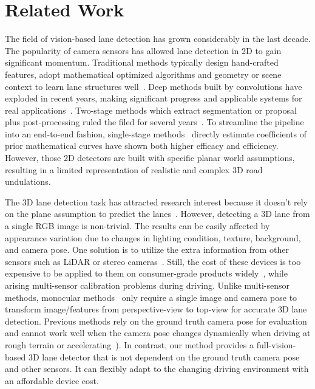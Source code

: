 \documentclass[letterpaper]{article} \usepackage{aaai22}  \usepackage{times}  \usepackage{helvet}  \usepackage{courier}  \usepackage[hyphens]{url}  \usepackage{graphicx} \urlstyle{rm} \def\UrlFont{\rm}  \usepackage{natbib}  \usepackage{caption}
\begin{document}
\section{Related Work}

The field of vision-based lane detection has grown considerably in the last decade. The popularity of camera sensors has allowed lane detection in 2D to gain significant momentum. Traditional methods typically design hand-crafted features, adopt mathematical optimized algorithms and geometry or scene context to learn lane structures well~\cite{LDWReview,LaneFeatureMethod,LaneModelMethod}. Deep methods built by convolutions have exploded in recent years, making significant progress and applicable systems for real applications~\cite{dpcheng3,zhaoyun1}. Two-stage methods which extract segmentation or proposal plus post-processing ruled the filed for several years~\cite{LaneNet,FastDraw,SCNN,LaneAndRoad,ENet-SAD,PINet,Line-CNN,LaneATT,UltraFast,CurveLaneNAS,LightWeightECCV,RowwiseClassification,HESA,RESA}. To streamline the pipeline into an end-to-end fashion, single-stage methods~\cite{PolyLaneNet,LSTR} directly estimate coefficients of prior mathematical curves have shown both higher efficacy and efficiency. However, those 2D detectors are built with specific planar world assumptions, resulting in a limited representation of realistic and complex 3D road undulations.

The 3D lane detection task has attracted research interest because it doesn't rely on the plane assumption to predict the lanes~\cite{GenRef5,GenRef19,GenRef2,3DLaneNet,GenLaneNet,Uncertainty,3DLaneICIP}. However, detecting a 3D lane from a single RGB image is non-trivial. The results can be easily affected by appearance variation due to changes in lighting condition, texture, background, and camera pose.  One solution is to utilize the extra information from other sensors such as LiDAR or stereo cameras~\cite{GenRef5,GenRef19,GenRef2}. Still, the cost of these devices is too expensive to be applied to them on consumer-grade products widely~\cite{GenLaneNet}, while arising multi-sensor calibration problems during driving. 
Unlike multi-sensor methods, monocular methods~\cite{3DLaneNet,GenLaneNet, Uncertainty} only require a single image and camera pose to transform image/features from perspective-view to top-view for accurate 3D lane detection. Previous methods rely on the ground truth camera pose for evaluation and cannot work well when the camera pose changes dynamically when driving at rough terrain or accelerating~\cite{MonoEF}). In contrast, our method provides a full-vision-based 3D lane detector that is not dependent on the ground truth camera pose and other sensors.  It can flexibly adapt to the changing driving environment with an affordable device cost.  
\end{document}
